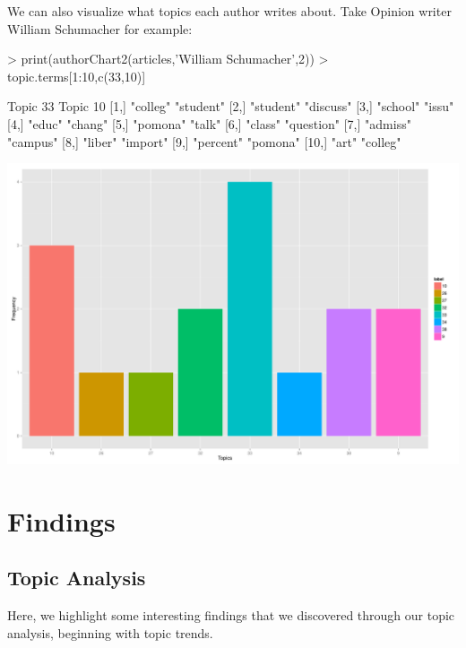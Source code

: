 \documentclass[a4paper]{article}
\begin{document}
We can also visualize what topics each author writes about. Take Opinion writer William Schumacher for example: 

\begin{Schunk}
\begin{Sinput}
> print(authorChart2(articles,'William Schumacher',2))
> topic.terms[1:10,c(33,10)]
\end{Sinput}
\begin{Soutput}
      Topic 33  Topic 10  
 [1,] "colleg"  "student" 
 [2,] "student" "discuss" 
 [3,] "school"  "issu"    
 [4,] "educ"    "chang"   
 [5,] "pomona"  "talk"    
 [6,] "class"   "question"
 [7,] "admiss"  "campus"  
 [8,] "liber"   "import"  
 [9,] "percent" "pomona"  
[10,] "art"     "colleg"  
\end{Soutput}
\end{Schunk}
\includegraphics{FinalProject-006}


\section{Findings}

\subsection{Topic Analysis}

Here, we highlight some interesting findings that we discovered through our topic analysis, beginning with topic trends.
\end{document}
